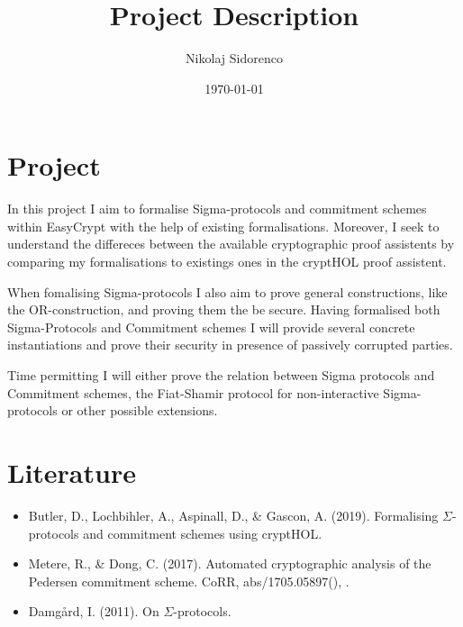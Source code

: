 \documentclass[11pt]{article}
\author{Nikolaj Sidorenco}
\date{\today}
\title{Project Description}
\begin{document}
\maketitle

\section{Project}
\label{sec:orgd37f878}

In this project I aim to formalise Sigma-protocols and commitment schemes within
EasyCrypt with the help of existing formalisations.
Moreover, I seek to understand the differeces between the available
cryptographic proof assistents by comparing my formalisations to existings ones
in the cryptHOL proof assistent.


When fomalising Sigma-protocols I also aim to prove general constructions, like
the OR-construction, and proving them the be secure. Having formalised both
Sigma-Protocols and Commitment schemes I will provide several concrete instantiations
and prove their security in presence of passively corrupted parties.


Time permitting I will either prove the relation between Sigma protocols and
Commitment schemes, the Fiat-Shamir protocol for non-interactive Sigma-protocols
or other possible extensions.


\section{Literature}
\label{sec:orgbd9b260}
\begin{itemize}
\item Butler, D., Lochbihler, A., Aspinall, D., \& Gascon, A. (2019). Formalising
\(\Sigma\)-protocols and commitment schemes using cryptHOL.
\item Metere, R., \& Dong, C. (2017). Automated cryptographic analysis of the
Pedersen commitment scheme. CoRR, abs/1705.05897(), .
\item Damgård, I. (2011). On \(\Sigma\)-protocols.
\end{itemize}
\end{document}
